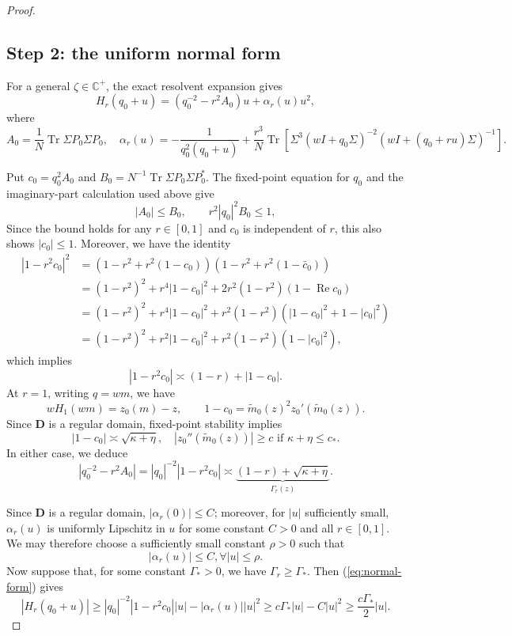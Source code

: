 \documentclass[11pt,reqno]{amsart}
\def\C{\mathbb{C}}
\def\bD{\mathbf{D}}
\def\Re{\operatorname{Re}}
\def\Tr{\operatorname{Tr}}
\theoremstyle{definition}
\numberwithin{equation}{section}
\numberwithin{figure}{section}
\begin{document}
\begin{proof}
\subsection*{Step 2: the uniform normal form}
For a general $\zeta\in\C^+$, the exact resolvent expansion gives
\begin{equation}\label{eq:normal-form}
 H_r(q_0+u)=(q_0^{-2}-r^2A_0) u+\alpha_r(u)u^2,
\end{equation}
where
\[
     A_0=\frac1N\Tr\Sigma P_0\Sigma P_0,\quad \alpha_r(u)=-\frac1{q_0^2(q_0+u)}
 +\frac{r^3}{N}\Tr\!\left[
 \Sigma^3(wI+q_0\Sigma)^{-2}
 (wI+(q_0+ru)\Sigma)^{-1}
 \right].
\]

Put $c_0=q_0^2A_0$ and
$B_0=N^{-1}\Tr\Sigma P_0\Sigma P_0^*$.  The fixed-point
equation for $q_0$ and the imaginary-part calculation used above give
\[
 |A_0|\le B_0,\qquad r^2|q_0|^2B_0\le1,
\]
Since the bound holds for any $r\in[0,1]$ and $c_0$ is independent of $r$, this also shows $|c_0|\leq 1$. Moreover, we have the identity
\begin{align*}
    |1-r^2c_0|^2&=(1-r^2+r^2(1-c_0))(1-r^2+r^2(1-\bar c_0))\\
    &=(1-r^2)^2+r^4|1-c_0|^2+2r^2(1-r^2)(1-\Re c_0)\\
    &=(1-r^2)^2+r^4|1-c_0|^2+r^2(1-r^2)(|1-c_0|^2+1-|c_0|^2)\\
    &=(1-r^2)^2+r^2|1-c_0|^2+r^2(1-r^2)(1-|c_0|^2),
\end{align*}
which implies
\begin{equation}\label{eq:noncancellation-scale}
 |1-r^2c_0|\asymp(1-r)+|1-c_0|.
\end{equation}
At $r=1$, writing $q=wm$, we have
\[
 wH_1(wm)=z_0(m)-z,
 \qquad
 1-c_0
 =\widetilde m_0(z)^2z_0'(\widetilde m_0(z)).
\]
Since $\bD$ is a regular domain, fixed-point stability implies
\begin{equation}\label{eq:fixed-point stability}
    |1-c_0|\asymp\sqrt{\kappa+\eta},\quad |z_0''(\widetilde m_0(z))|\geq c \text{ if $\kappa+\eta\leq c_*$}.
\end{equation}
In either case, we deduce
\begin{equation}\label{eq:beta-scale}
 |q_0^{-2}-r^2A_0|=|q_0|^{-2}|1-r^2c_0|\asymp \underbrace{(1-r)+\sqrt{\kappa+\eta}}_{\Gamma_r(z)}.
\end{equation}

Since $\bD$ is a regular domain, $|\alpha_r(0)|\leq C$; moreover, for $|u|$ sufficiently small, $\alpha_r(u)$ is uniformly Lipschitz in $u$ for some constant $C>0$ and all $r\in[0,1]$. We may therefore choose a sufficiently small constant $\rho>0$ such that
\[
    |\alpha_r(u)|\leq C,\forall |u|\leq \rho.
\]
Now suppose that, for some constant $\Gamma_*>0$, we have $\Gamma_r\geq \Gamma_*$. Then (\ref{eq:normal-form}) gives
\begin{equation}\label{eq:large gamma}
    |H_r(q_0+u)|\geq |q_0|^{-2}|1-r^2c_0||u|-|\alpha_r(u)||u|^2\geq c\Gamma_*|u|-C|u|^2\geq \frac{c\Gamma_*}{2}|u|.
\end{equation}


\end{proof}
\end{document}
